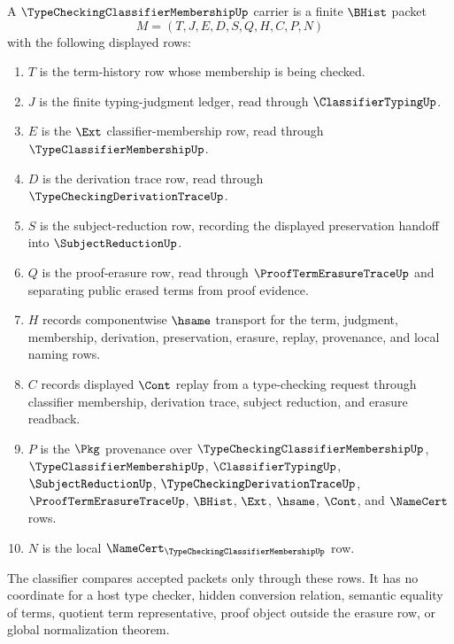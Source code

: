 \begin{definition}
\label{def:type-checking-classifier-membership-carrier}
A $\TypeCheckingClassifierMembershipUp$ carrier is a finite $\BHist$ packet
$$
M=(T,J,E,D,S,Q,H,C,P,N)
$$
with the following displayed rows:
\begin{enumerate}
\item $T$ is the term-history row whose membership is being checked.
\item $J$ is the finite typing-judgment ledger, read through $\ClassifierTypingUp$.
\item $E$ is the $\Ext$ classifier-membership row, read through $\TypeClassifierMembershipUp$.
\item $D$ is the derivation trace row, read through $\TypeCheckingDerivationTraceUp$.
\item $S$ is the subject-reduction row, recording the displayed preservation handoff into $\SubjectReductionUp$.
\item $Q$ is the proof-erasure row, read through $\ProofTermErasureTraceUp$ and separating public erased terms from proof evidence.
\item $H$ records componentwise $\hsame$ transport for the term, judgment, membership, derivation, preservation, erasure, replay, provenance, and local naming rows.
\item $C$ records displayed $\Cont$ replay from a type-checking request through classifier membership, derivation trace, subject reduction, and erasure readback.
\item $P$ is the $\Pkg$ provenance over $\TypeCheckingClassifierMembershipUp$, $\TypeClassifierMembershipUp$, $\ClassifierTypingUp$, $\SubjectReductionUp$, $\TypeCheckingDerivationTraceUp$, $\ProofTermErasureTraceUp$, $\BHist$, $\Ext$, $\hsame$, $\Cont$, and $\NameCert$ rows.
\item $N$ is the local $\NameCert_{\TypeCheckingClassifierMembershipUp}$ row.
\end{enumerate}
The classifier compares accepted packets only through these rows. It has no coordinate for a host type checker, hidden conversion relation, semantic equality of terms, quotient term representative, proof object outside the erasure row, or global normalization theorem.
\end{definition}

